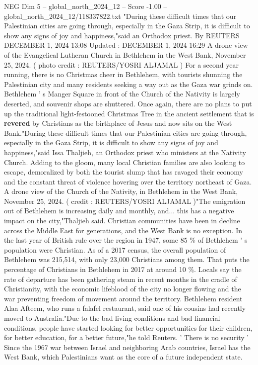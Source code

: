 \begin{textsample}{NEG Dim 5 – global\_north\_2024\_12 – Score -1.00 – global\_north\_2024\_12/118337822.txt}  \label{ex:f5_neg_338}
"During these difficult times that our Palestinian cities are going through, especially in the Gaza Strip, it is difficult to show any signs of joy and happiness,"said an Orthodox priest.
By REUTERS DECEMBER 1, 2024 13:08 Updated : DECEMBER 1, 2024 16:29 A drone view of the Evangelical Lutheran Church in Bethlehem in the West Bank, November 25, 2024. ( photo credit : REUTERS/YOSRI ALJAMAL ) For a second year running, there is no Christmas cheer in Bethlehem, with tourists shunning the Palestinian city and many residents seeking a way out as the Gaza war grinds on.
Bethlehem ' s Manger Square in front of the Church of the Nativity is largely deserted, and souvenir shops are shuttered.
Once again, there are no plans to put up the traditional light-festooned Christmas Tree in the ancient settlement that is \textbf{revered} by Christians as the birthplace of Jesus and now sits on the West Bank."During these difficult times that our Palestinian cities are going through, especially in the Gaza Strip, it is difficult to show any signs of joy and happiness,"said Issa Thaljieh, an Orthodox priest who ministers at the Nativity Church.
Adding to the gloom, many local Christian families are also looking to escape, demoralized by both the tourist slump that has ravaged their economy and the constant threat of violence hovering over the territory northeast of Gaza.
A drone view of the Church of the Nativity, in Bethlehem in the West Bank, November 25, 2024. ( credit : REUTERS/YOSRI ALJAMAL )"The emigration out of Bethlehem is increasing daily and monthly, and... this has a negative impact on the city,"Thaljieh said.
Christian communities have been in decline across the Middle East for generations, and the West Bank is no exception.
In the last year of British rule over the region in 1947, some 85 \% of Bethlehem ' s population were Christian.
As of a 2017 census, the overall population of Bethlehem was 215,514, with only 23,000 Christians among them.
That puts the percentage of Christians in Bethlehem in 2017 at around 10 \%.
Locals say the rate of departure has been gathering steam in recent months in the cradle of Christianity, with the economic lifeblood of the city no longer flowing and the war preventing freedom of movement around the territory.
Bethlehem resident Alaa Afteem, who runs a falafel restaurant, said one of his cousins had recently moved to Australia."Due to the bad living conditions and bad financial conditions, people have started looking for better opportunities for their children, for better education, for a better future,"he told Reuters. ' There is no security ' Since the 1967 war between Israel and neighboring Arab countries, Israel has the West Bank, which Palestinians want as the core of a future independent state.

\end{textsample}
